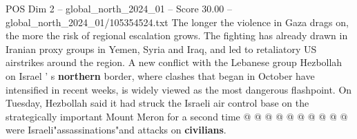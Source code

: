 \begin{textsample}{POS Dim 2 – global\_north\_2024\_01 – Score 30.00 – global\_north\_2024\_01/105354524.txt}
The longer the violence in Gaza drags on, the more the risk of regional escalation grows.
The fighting has already drawn in Iranian proxy groups in Yemen, Syria and Iraq, and led to retaliatory US airstrikes around the region.
A new conflict with the Lebanese group Hezbollah on Israel ' s \textbf{northern} border, where clashes that began in October have intensified in recent weeks, is widely viewed as the most dangerous flashpoint.
On Tuesday, Hezbollah said it had struck the Israeli air control base on the strategically important Mount Meron for a second time @ @ @ @ @ @ @ @ @ @ were Israeli"assassinations"and attacks on \textbf{civilians}.

\end{textsample}
